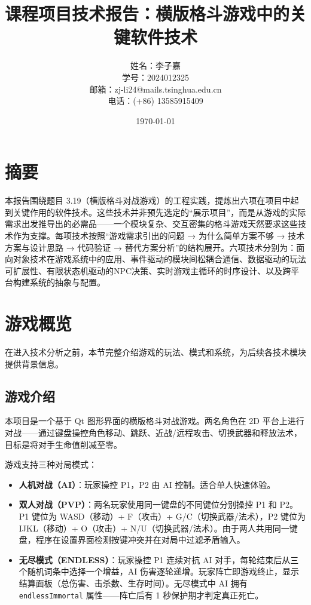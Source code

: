 \documentclass[utf8]{ctexart}
\title{课程项目技术报告：横版格斗游戏中的关键软件技术}
\author{
姓名：李子嘉 \\
学号：2024012325 \\
邮箱：zj-li24@mails.tsinghua.edu.cn \\
电话：(+86) 13585915409
}
\date{\today}
\begin{document}
\maketitle
\tableofcontents
\newpage

\section*{摘要}

本报告围绕题目 3.19（横版格斗对战游戏）的工程实践，提炼出六项在项目中起到关键作用的软件技术。这些技术并非预先选定的“展示项目”，而是从游戏的实际需求出发推导出的必需品——一个模块复杂、交互密集的格斗游戏天然要求这些技术作为支撑。每项技术按照“游戏需求引出的问题 → 为什么简单方案不够 → 技术方案与设计思路 → 代码验证 → 替代方案分析”的结构展开。六项技术分别为：面向对象技术在游戏系统中的应用、事件驱动的模块间松耦合通信、数据驱动的玩法可扩展性、有限状态机驱动的NPC决策、实时游戏主循环的时序设计、以及跨平台构建系统的抽象与配置。

\newpage

\section{游戏概览}

在进入技术分析之前，本节完整介绍游戏的玩法、模式和系统，为后续各技术模块提供背景信息。

\subsection{游戏介绍}

本项目是一个基于 Qt 图形界面的横版格斗对战游戏。两名角色在 2D 平台上进行对战——通过键盘操控角色移动、跳跃、近战/远程攻击、切换武器和释放法术，目标是将对手生命值削减至零。

游戏支持三种对局模式：

\begin{itemize}
  \item \textbf{人机对战（AI）}：玩家操控 P1，P2 由 AI 控制。适合单人快速体验。
  \item \textbf{双人对战（PVP）}：两名玩家使用同一键盘的不同键位分别操控 P1 和 P2。P1 键位为 WASD（移动）+ F（攻击）+ G/C（切换武器/法术），P2 键位为 IJKL（移动）+ O（攻击）+ N/U（切换武器/法术）。由于两人共用同一键盘，程序在设置界面检测按键冲突并在对局中过滤矛盾输入。
  \item \textbf{无尽模式（ENDLESS）}：玩家操控 P1 连续对抗 AI 对手，每轮结束后从三个随机词条中选择一个增益，AI 伤害逐轮递增。玩家阵亡即游戏终止，显示结算面板（总伤害、击杀数、生存时间）。无尽模式中 AI 拥有 \texttt{endlessImmortal} 属性——阵亡后有 1 秒保护期才判定真正死亡。
\end{itemize}
\end{document}
